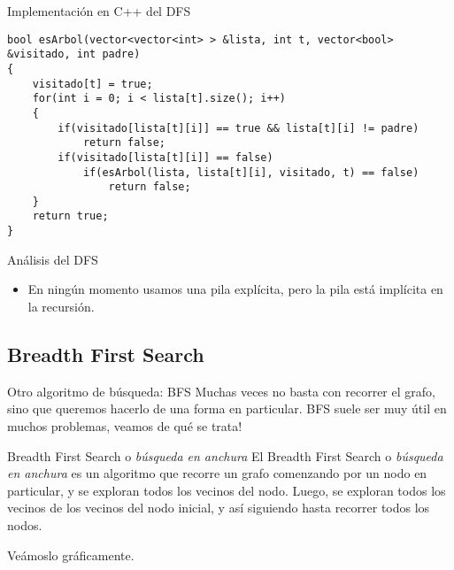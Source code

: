 \documentclass[compress]{beamer}
\begin{document}
\begin{frame}[fragile]{Implementación en C++ del DFS}
\begin{lstlisting}
bool esArbol(vector<vector<int> > &lista, int t, vector<bool> &visitado, int padre)
{
    visitado[t] = true;
    for(int i = 0; i < lista[t].size(); i++)
    {
        if(visitado[lista[t][i]] == true && lista[t][i] != padre)
            return false;
        if(visitado[lista[t][i]] == false)
            if(esArbol(lista, lista[t][i], visitado, t) == false)
                return false;
    }
    return true;
}
\end{lstlisting}
\end{frame}

\begin{frame}{Análisis del DFS}
\begin{itemize}
\item En ningún momento usamos una pila explícita, pero la pila está implícita en la recursión.
\pause
{}
\pause
{}
\pause
{}
\end{itemize}
\end{frame}

\subsection{Breadth First Search}
\begin{frame}{Otro algoritmo de búsqueda: BFS}
Muchas veces no basta con recorrer el grafo, sino que queremos hacerlo de una forma en particular. BFS suele ser muy útil en muchos problemas, veamos de qué se trata!
\bigskip

\begin{block}{Breadth First Search o \textit{búsqueda en anchura}}
El Breadth First Search o \textit{búsqueda en anchura} es un algoritmo que recorre un grafo comenzando por un nodo en particular, y se exploran todos los vecinos del nodo. Luego, se exploran todos los vecinos de los vecinos del nodo inicial, y así siguiendo hasta recorrer todos los nodos.
\end{block}

Veámoslo gráficamente.
\end{frame}
\end{document}
